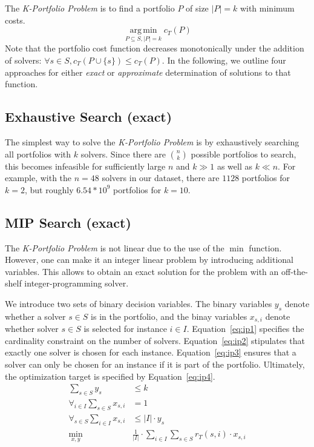 \documentclass[conference]{IEEEtran}
\DeclareMathOperator*{\argmin}{arg\,min}
\begin{document}
The \emph{K-Portfolio Problem} is to find a portfolio $P$ of size $|P| = k$ with minimum costs.%
$$
\argmin\limits_{P \subseteq S, |P| = k} c_{T}(P)
$$
Note that the portfolio cost function decreases monotonically under the addition of solvers: $\forall s \in S, c_{T}(P \cup \{s\}) \leq c_{T}(P)$. 
In the following, we outline four approaches for either \emph{exact} or \emph{approximate} determination of solutions to that function. 

\subsection{Exhaustive Search (exact)}

The simplest way to solve the \emph{K-Portfolio Problem} is by exhaustively searching all portfolios with $k$ solvers. 
Since there are $\binom{n}{k}$ possible portfolios to search, this becomes infeasible for sufficiently large $n$ and $k \gg 1$ as well as $k \ll n$.
For example, with the $n=48$ solvers in our dataset, there are $1128$ portfolios for $k=2$, but roughly $6.54 * 10^9$ portfolios for $k=10$.

\subsection{MIP Search (exact)}

The \emph{K-Portfolio Problem} is not linear due to the use of the $\min$ function.
However, one can make it an integer linear problem by introducing additional variables.
This allows to obtain an exact solution for the problem with an off-the-shelf integer-programming solver.

We introduce two sets of binary decision variables. 
The binary variables $y_s$ denote whether a solver $s \in S$ is in the portfolio, and 
the binay variables $x_{s,i}$ denote whether solver $s \in S$ is selected for instance $i \in I$. 
Equation~\ref{eq:ip1} specifies the cardinality constraint on the number of solvers. 
Equation~\ref{eq:ip2} stipulates that exactly one solver is chosen for each instance. 
Equation~\ref{eq:ip3} ensures that a solver can only be chosen for an instance if it is part of the portfolio. 
Ultimately, the optimization target is specified by Equation~\ref{eq:ip4}.%
\begin{align}
	\sum_{s \in S} y_s &\leq k \label{eq:ip1}\\
	\forall_{i\in I} \sum_{s \in S} x_{s,i} &= 1 \label{eq:ip2}\\
	\forall_{s \in S} \sum_{i \in I} x_{s,i} &\leq |I| \cdot y_s \label{eq:ip3}\\
	\min_{x,y} \quad & \frac{1}{|I|} \cdot \sum_{i \in I} \sum_{s \in S} r_T(s,i) \cdot x_{s,i} \label{eq:ip4}
\end{align}
\end{document}
